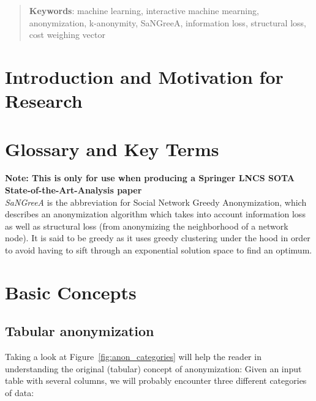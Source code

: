 \documentclass{llncs}
\begin{document}
\begin{abstract}
\medskip

\textbf{Keywords}: machine learning, interactive machine mearning, anonymization, k-anonymity, SaNGreeA, information loss, structural loss, cost weighing vector


\end{abstract}

\renewcommand{\thesubfigure}{\thefigure.\arabic{subfigure}}
\makeatletter
\renewcommand{\p@subfigure}{}
\renewcommand{\@thesubfigure}{\thesubfigure:\hskip\subfiglabelskip}
\makeatother

\section{Introduction and Motivation for Research}


\section{Glossary and Key Terms}

\textbf{Note: This is only for use when producing a Springer LNCS SOTA State-of-the-Art-Analysis paper}
\\[0,2cm]
\emph{SaNGreeA} is the abbreviation for Social Network Greedy Anonymization, which describes an anonymization algorithm which takes into account information loss as well as structural loss (from anonymizing the neighborhood of a network node). It is said to be greedy as it uses greedy clustering under the hood in order to avoid having to sift through an exponential solution space to find an optimum.


\section{Basic Concepts}
\label{sect:basic_concepts}

\subsection{Tabular anonymization}
\label{ssect:tab_anonym}

Taking a look at Figure~\ref{fig:anon_categories} will help the reader in understanding the original (tabular) concept of anonymization: Given an input table with several columns, we will probably encounter three different categories of data:
\end{document}
